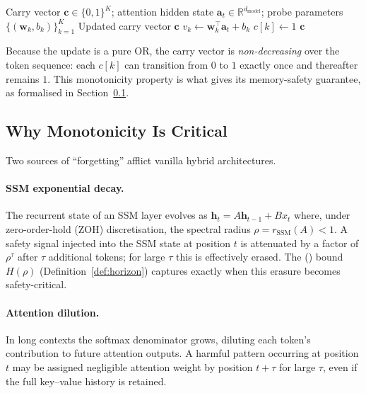 \documentclass{article}
\newcommand{\rSSM}{r_{\mathrm{SSM}}}
\newcommand{\Horizon}{\mathcal{H}(\rho)}
\newcommand{\MBCA}{\mathrm{MBCA}}
\begin{document}
\begin{algorithm}[t]
\caption{\MBCA{} Carry Update}
\label{alg:mbca}
\begin{algorithmic}[1]
\Require Carry vector $\mathbf{c} \in \{0,1\}^K$; attention hidden state
         $\mathbf{a}_t \in \mathbb{R}^{d_{\mathrm{model}}}$;
         probe parameters $\{(\mathbf{w}_k, b_k)\}_{k=1}^{K}$
\Ensure Updated carry vector $\mathbf{c}$
  \State $v_k \leftarrow \mathbf{w}_k^{\top}\mathbf{a}_t + b_k$
    \State $c[k] \leftarrow 1$
  \EndIf
\EndFor
\State \Return $\mathbf{c}$
\end{algorithmic}
\end{algorithm}

\noindent Because the update is a pure OR, the carry vector is
\emph{non-decreasing} over the token sequence: each $c[k]$ can transition from
$0$ to $1$ exactly once and thereafter remains $1$.  This monotonicity property
is what gives \MBCA{} its memory-safety guarantee, as formalised in
Section~\ref{sec:mbca:monotone}.

\subsection{Why Monotonicity Is Critical}
\label{sec:mbca:monotone}

Two sources of ``forgetting'' afflict vanilla hybrid architectures.

\paragraph{SSM exponential decay.}
The recurrent state of an SSM layer evolves as $\mathbf{h}_t = A\mathbf{h}_{t-1}
+ B x_t$ where, under zero-order-hold (ZOH) discretisation, the spectral radius
$\rho = \rSSM(A) < 1$.  A safety signal injected into the SSM state at position
$t$ is attenuated by a factor of $\rho^{\tau}$ after $\tau$ additional tokens;
for large $\tau$ this is effectively erased.  The \Horizon{} bound $H(\rho)$
(Definition~\ref{def:horizon}) captures exactly when this erasure becomes
safety-critical.

\paragraph{Attention dilution.}
In long contexts the softmax denominator grows, diluting each token's
contribution to future attention outputs.  A harmful pattern occurring at
position $t$ may be assigned negligible attention weight by position $t + \tau$
for large $\tau$, even if the full key--value history is retained.
\end{document}
